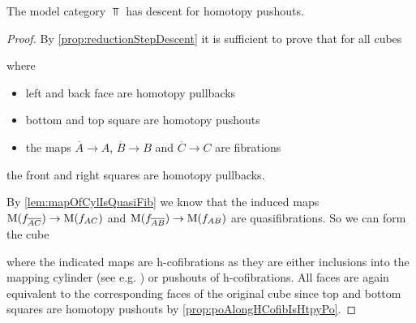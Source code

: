 \begin{prop}\label{lem:topDescentPo}
    The model category $\Top$ has descent for homotopy pushouts. 
    \begin{proof}
        By \cref{prop:reductionStepDescent} it is sufficient to prove that for all cubes 
        \begin{center}
        \end{center}
        where 
        \begin{itemize}
            \item left and back face are homotopy pullbacks
            \item bottom and top square are homotopy pushouts
            \item the maps $\overline{A}\to A$, $\overline{B}\to B$ and $\overline{C}\to C$ are fibrations
        \end{itemize}
        the front and right squares are homotopy pullbacks.

        By \cref{lem:mapOfCylIsQuasiFib} we know that the induced maps $\operatorname{M}(f_{\overline{A}\overline{C}})\to\operatorname{M}(f_{AC})$ and $\operatorname{M}(f_{\overline{A}\overline{B}})\to\operatorname{M}(f_{AB})$ are quasifibrations. %
        So we can form the cube 
        \begin{center}
        \end{center}
        where the indicated maps are h-cofibrations as they are either inclusions into the mapping cylinder (see e.g. \cite[Theorem 2]{note_on_cofibs_1}) or pushouts of h-cofibrations.
        All faces are again equivalent to the corresponding faces of the original cube since top and bottom squares are homotopy pushouts by \cref{prop:poAlongHCofibIsHtpyPo}.
        

\end{proof}
\end{prop}
